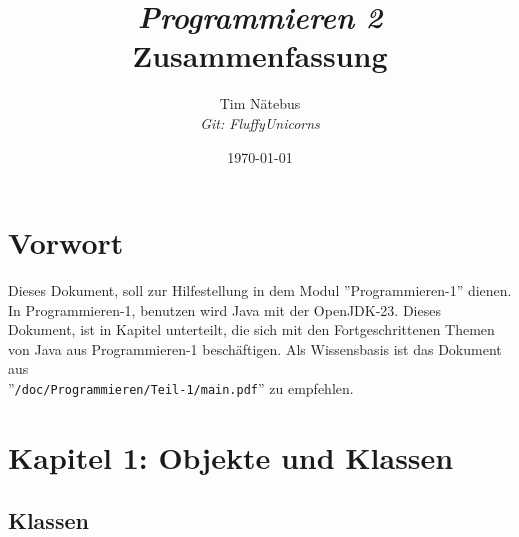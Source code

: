\documentclass[12pt, a4paper]{article}
\title{
    \textit{Programmieren 2} \\
        \large Zusammenfassung
}
\author{
    Tim Nätebus \\
    \large \textit{Git: FluffyUnicorns}
}
\date{\today}
\begin{document}
\maketitle
\newpage
\tableofcontents
\newpage
\section*{Vorwort}
Dieses Dokument, soll zur Hilfestellung in dem Modul ''Programmieren-1'' dienen.
In Programmieren-1, benutzen wird Java mit der OpenJDK-23.
Dieses Dokument, ist in Kapitel unterteilt, die sich mit den Fortgeschrittenen Themen von Java aus Programmieren-1 beschäftigen. 
Als Wissensbasis ist das Dokument aus \\''\texttt{/doc/Programmieren/Teil-1/main.pdf}'' zu empfehlen.
\section*{Kapitel 1: Objekte und Klassen}
\subsection*{Klassen}
\end{document}
